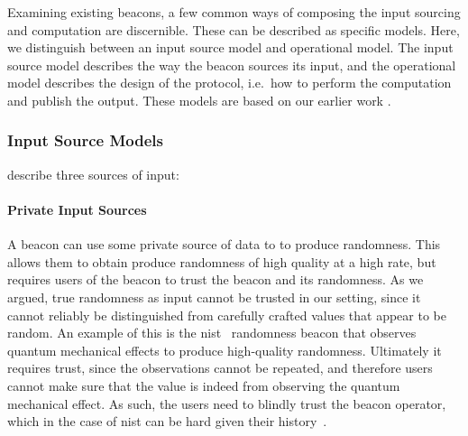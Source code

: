 Examining existing beacons, a few common ways of composing the input sourcing and computation are discernible. 
These can be described as specific models. 
Here, we distinguish between an input source model and operational model. The input source model describes the way the beacon sources its input, and the operational model describes the design of the protocol, i.e.\ how to perform the computation and publish the output. These models are based on our earlier work .

\subsubsection{Input Source Models}
 describe three sources of input:

\paragraph{Private Input Sources} A beacon can use some private source of data to to produce randomness. This allows them to obtain produce randomness of high quality at a high rate, but requires users of the beacon to trust the beacon and its randomness.
As we argued, true randomness as input cannot be trusted in our setting, since it cannot reliably be distinguished from carefully crafted values that appear to be random.
An example of this is the \gls{nist}~\cite{nistbeacon} randomness beacon that observes quantum mechanical effects to produce high-quality randomness.
Ultimately it requires trust, since the observations cannot be repeated, and therefore users cannot make sure that the value is indeed from observing the quantum mechanical effect.
As such, the users need to blindly trust the beacon operator, which in the case of \gls{nist} can be hard given their history~\cite{nytimes-nsabackdoors, nytimes-nsaconstants, nist2014backdoor}.


